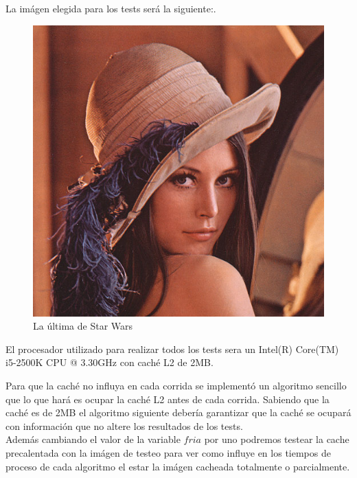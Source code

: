 La imágen elegida para los tests será la siguiente:.

\newpage

\begin{figure}
  \begin{center}
	\includegraphics[scale=.5]{imagenes/lena32.jpg}
	\caption{La última de Star Wars}
	\label{lena}
  \end{center}
\end{figure}

El procesador utilizado para realizar todos los tests sera un Intel(R) Core(TM) i5-2500K CPU @ 3.30GHz con caché L2 de 2MB.

Para que la caché no influya en cada corrida se implementó un algoritmo sencillo que lo que hará es ocupar la caché L2 antes de cada corrida. Sabiendo que la caché es de 2MB el algoritmo siguiente debería garantizar que la caché se ocupará con información que no altere los resultados de los tests. \\
Además cambiando el valor de la variable $fria$ por uno podremos testear la cache precalentada con la imágen de testeo para ver como influye en los tiempos de proceso de cada algoritmo el estar la imágen cacheada totalmente o parcialmente.

